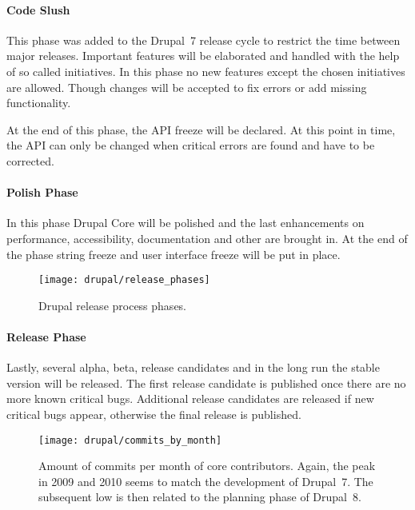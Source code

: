 \paragraph{Code Slush}

This phase was added to the Drupal~7 release cycle to restrict the time between
major releases. Important features will be elaborated and handled with the help
of so called initiatives. In this phase no new features except the chosen
initiatives are allowed. Though changes will be accepted to fix errors or add
missing functionality.

At the end of this phase, the \ac{API} freeze will be declared. At this point
in time, the \ac{API} can only be changed when critical errors are
found and have to be corrected.

\paragraph{Polish Phase}

In this phase Drupal Core will be polished and the last enhancements on
performance, accessibility, documentation and other are brought in. At the end
of the phase string freeze and user interface freeze will be put in place.

\begin{figure}[hbtp]
  \centering
  \texttt{[image: drupal/release\_phases]}
  \caption[Drupal Release Process Phases]{Drupal release process phases.}
\end{figure}

\paragraph{Release Phase}

Lastly, several alpha, beta, release candidates and in the long run the stable
version will be released. The first release candidate is published once there
are no more known critical bugs. Additional release candidates are released if
new critical bugs appear, otherwise the final release is published.

\begin{figure}[htbp]
  \centering
  \texttt{[image: drupal/commits\_by\_month]}
  \caption[Commits by Month, Drupal]
  {Amount of commits per month of core contributors. Again, the peak in 2009
    and 2010 seems to match the development of Drupal~7. The subsequent low is
    then related to the planning phase of Drupal~8.}
  \label{fig:drupal:cbm}
\end{figure}

